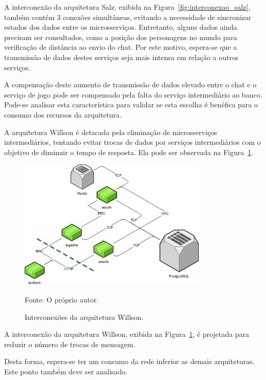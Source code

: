 A interconexão da arquitetura Salz, exibida na Figura~\ref{fig:interconexao_salz}, também contém 3 conexões simultâneas, evitando a necessidade de sincronizar estados dos dados entre os microsserviços.
%
Entretanto, alguns dados ainda precisam ser consultados, como a posição dos personagens no mundo para verificação de distância ao envio do chat.
%
Por este motivo, espera-se que a transmissão de dados destes serviços seja mais intensa em relação a outros serviços.



A compensação deste aumento de transmissão de dados elevado entre o chat e o serviço de jogo pode ser compensado pela falta do serviço intermediário ao banco.
%
Pode-se analisar esta característica para validar se esta escolha é benéfica para o consumo dos recursos da arquitetura.



A arquitetura Willson é detacada pela eliminação de microsserviços intermediários, tentando evitar trocas de dados por serviços intermediários com o objetivo de diminuir o tempo de resposta.
%
Ela pode ser observada na Figura~\ref{fig:interconexao_willson}.



\begin{figure}[htb!]
  \caption{Interconexões da arquitetura Willson.}
  \label{fig:interconexao_willson}
  \includegraphics[width=0.8\textwidth]{figuras/interconexoes/willson.png}
  \centering

  Fonte: O próprio autor.
\end{figure}



A interconexão da arquitetura Willson, exibida na Figura~\ref{fig:interconexao_willson}, é projetada para reduzir o número de trocas de mensagem.
%


Desta forma, espera-se ter um consumo da rede inferior as demais arquiteturas. Este ponto também deve ser analisado.
